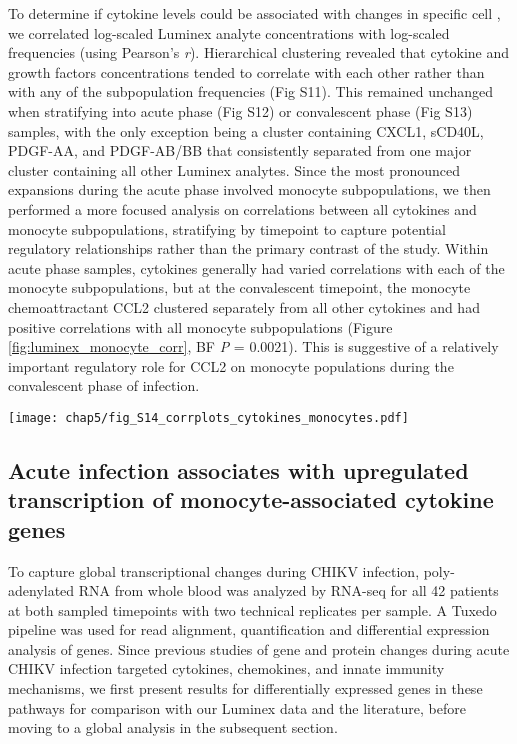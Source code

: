 To determine if cytokine levels could be associated with changes in specific cell \subcommunities{}, we correlated log-scaled Luminex analyte concentrations with log-scaled \subcommunity{} frequencies (using Pearson’s \emph{r}). Hierarchical clustering revealed that cytokine and growth factors concentrations tended to correlate with each other rather than with any of the subpopulation frequencies (Fig S11). This remained unchanged when stratifying into acute phase (Fig S12) or convalescent phase (Fig S13) samples, with the only exception being a cluster containing CXCL1, sCD40L, PDGF-AA, and PDGF-AB/BB that consistently separated from one major cluster containing all other Luminex analytes. Since the most pronounced expansions during the acute phase involved monocyte subpopulations, we then performed a more focused analysis on correlations between all cytokines and monocyte subpopulations, stratifying by timepoint to capture potential regulatory relationships rather than the primary contrast of the study. Within acute phase samples, cytokines generally had varied correlations with each of the monocyte subpopulations, but at the convalescent timepoint, the monocyte chemoattractant CCL2 clustered separately from all other cytokines and had positive correlations with all monocyte subpopulations (Figure \ref{fig:luminex_monocyte_corr}, BF \emph{P} = 0.0021). This is suggestive of a relatively important regulatory role for CCL2 on monocyte populations during the convalescent phase of infection.

\begin{figure*}[hb]
  \centering
  \texttt{[image: chap5/fig\_S14\_corrplots\_cytokines\_monocytes.pdf]}
  \caption[Clustered heatmap of Pearson correlations between log-scaled serum cytokine concentration and log-scaled monocyte subphenotype frequencies]{
  \textbf{Clustered heatmap of Pearson correlations between log-scaled serum cytokine concentration and log-scaled monocyte subphenotype frequencies.} A, within acute phase samples. B, within convalescent phase samples.
  }
  \label{fig:luminex_monocyte_corr}
\end{figure*}

\subsection{Acute infection associates with upregulated transcription of monocyte-associated cytokine genes}

To capture global transcriptional changes during CHIKV infection, poly-\allowbreak a\-den\-yl\-a\-ted RNA from whole blood was analyzed by RNA-seq for all 42 patients at both sampled timepoints with two technical replicates per sample. A Tuxedo pipeline was used for read alignment, quantification and differential expression analysis of genes. Since previous studies of gene and protein changes during acute CHIKV infection targeted cytokines, chemokines, and innate immunity mechanisms,\autocite{Chow2011,Hoarau2010,Ng2009,Teng2015,Wauquier2011} we first present results for differentially expressed genes in these pathways for comparison with our Luminex data and the literature, before moving to a global analysis in the subsequent section.

